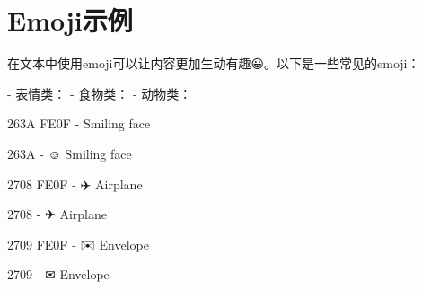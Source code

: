 \documentclass{ctexart}
\begin{document}
\section{Emoji示例}
在文本中使用emoji可以让内容更加生动有趣😀。以下是一些常见的emoji：

- 表情类： 
- 食物类：  
- 动物类：  

263A FE0F  -  Smiling face

263A       - ☺ Smiling face

2708 FE0F  - ✈️ Airplane

2708       - ✈ Airplane

2709 FE0F  - ✉️ Envelope

2709       - ✉ Envelope
\end{document}
